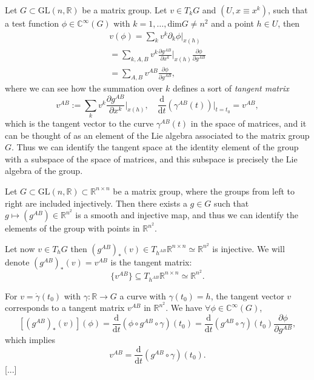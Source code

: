 \begin{definition}
    Let \(G \subset \mathrm{GL}(n, \mathbb{R})\) be a matrix group. Let \(v \in T_k G\) and \((U,x\equiv x^k)\), such that a test function \(\phi \in \mathbb{C}^{\infty}(G)\) with \(k = 1,\dots , \text{dim}G \neq n^2\) and a point \(h \in U\), then
    \[
        \begin{aligned}
            v(\phi) = \sum_{k} v^k \partial_k \phi \big|_{x(h)}                                                         \\
            = \sum_{k,A,B} v^k \frac{\partial g^{AB}}{\partial x^k} \bigg|_{x(h)} \frac{\partial \phi}{\partial g^{AB}} \\
            = \sum_{A,B} v^{AB} \frac{\partial \phi}{\partial g^{AB}},
        \end{aligned}
    \]
    where we can see how the summation over \(k\) defines a sort of \textit{tangent matrix}
    \[
        v^{AB} := \sum_{k} v^k \frac{\partial g^{AB}}{\partial x^k} \bigg|_{x(h)}, \quad \frac{\mathrm{d}}{\mathrm{d} t} (\gamma^{AB}(t)) \bigg|_{t=t_0} = v^{AB},
    \]
    which is the tangent vector to the curve \(\gamma^{AB}(t)\) in the space of matrices, and it can be thought of as an element of the Lie algebra associated to the matrix group \(G\). Thus we can identify the tangent space at the identity element of the group with a subspace of the space of matrices, and this subspace is precisely the Lie algebra of the group.
\end{definition}





\begin{definition}
    Let \(G \subset \mathrm{GL}(n, \mathbb{R}) \subset \mathbb{R}^{n\times n}\) be a matrix group, where the groups from left to right are included injectively. Then there exists a \(g \in G\) such that \(g \mapsto (g^{AB})\in \mathbb{R}^{n^2}\) is a smooth and injective map, and thus we can identify the elements of the group with points in \(\mathbb{R}^{n^2}\).

    Let now \(v \in T_h G\) then \((g^{AB})_*(v) \in T_{h^{AB}}\mathbb{R}^{n \times n} \simeq \mathbb{R}^{n^2}\) is injective. We will denote \((g^{AB})_*(v) = v^{AB}\) is the tangent matrix:
    \[
        \{v^{AB}\} \subseteq T_{h^{AB}} \mathbb{R}^{n \times n} \simeq \mathbb{R}^{n^2}.
    \]
\end{definition}

For \(v = \dot{\gamma}(t_0)\) with \(\gamma : \mathbb{R} \to G\) a curve with \(\gamma(t_0) = h\), the tangent vector \(v\) corresponds to a tangent matrix \(v^{AB}\) in \(\mathbb{R}^{n^2}\). We have \(\forall \phi \in \mathbb{C}^{\infty}(G)\),
\[
    [(g^{AB})_*(v)](\phi) = \frac{\mathrm{d}}{\mathrm{d} t} (\phi \circ g^{AB} \circ \gamma) (t_0) = \frac{\mathrm{d}}{\mathrm{d} t} (g^{AB} \circ \gamma) (t_0) \frac{\partial \phi}{\partial g^{AB}},
\]
which implies
\[
    v^{AB} = \frac{\mathrm{d}}{\mathrm{d} t} (g^{AB} \circ \gamma) (t_0).
\]
[...]


